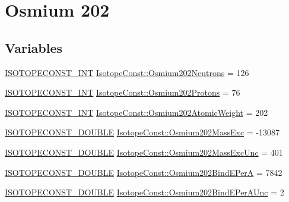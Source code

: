 \hypertarget{group___isotope_const-_osmium-_os202}{}\section{Osmium 202}
\label{group___isotope_const-_osmium-_os202}
\subsection*{Variables}
\begin{DoxyCompactItemize}
\item 
\mbox{\hyperlink{group___isotope_const-_macros_ga5f18360b3e99483a35c32d789e62621c}{I\+S\+O\+T\+O\+P\+E\+C\+O\+N\+S\+T\+\_\+\+I\+NT}} \mbox{\hyperlink{group___isotope_const-_osmium-_os202_ga34734d8dc110f511aa710b1c0f65a546}{Isotope\+Const\+::\+Osmium202\+Neutrons}} = 126
\item 
\mbox{\hyperlink{group___isotope_const-_macros_ga5f18360b3e99483a35c32d789e62621c}{I\+S\+O\+T\+O\+P\+E\+C\+O\+N\+S\+T\+\_\+\+I\+NT}} \mbox{\hyperlink{group___isotope_const-_osmium-_os202_ga82ee0d50f3615f4c6d0e653bf374734b}{Isotope\+Const\+::\+Osmium202\+Protons}} = 76
\item 
\mbox{\hyperlink{group___isotope_const-_macros_ga5f18360b3e99483a35c32d789e62621c}{I\+S\+O\+T\+O\+P\+E\+C\+O\+N\+S\+T\+\_\+\+I\+NT}} \mbox{\hyperlink{group___isotope_const-_osmium-_os202_ga24668aa039cf7981f9346193b29972a8}{Isotope\+Const\+::\+Osmium202\+Atomic\+Weight}} = 202
\item 
\mbox{\hyperlink{group___isotope_const-_macros_ga8f45a7272ce02c0b4c65c44636ed719a}{I\+S\+O\+T\+O\+P\+E\+C\+O\+N\+S\+T\+\_\+\+D\+O\+U\+B\+LE}} \mbox{\hyperlink{group___isotope_const-_osmium-_os202_gac935b28272b77e0fa898fdcc9ae56732}{Isotope\+Const\+::\+Osmium202\+Mass\+Exc}} = -\/13087
\item 
\mbox{\hyperlink{group___isotope_const-_macros_ga8f45a7272ce02c0b4c65c44636ed719a}{I\+S\+O\+T\+O\+P\+E\+C\+O\+N\+S\+T\+\_\+\+D\+O\+U\+B\+LE}} \mbox{\hyperlink{group___isotope_const-_osmium-_os202_ga17db136754686884f47c11d40604431c}{Isotope\+Const\+::\+Osmium202\+Mass\+Exc\+Unc}} = 401
\item 
\mbox{\hyperlink{group___isotope_const-_macros_ga8f45a7272ce02c0b4c65c44636ed719a}{I\+S\+O\+T\+O\+P\+E\+C\+O\+N\+S\+T\+\_\+\+D\+O\+U\+B\+LE}} \mbox{\hyperlink{group___isotope_const-_osmium-_os202_ga34dbbc7510856dd3c8524faaba2b309d}{Isotope\+Const\+::\+Osmium202\+Bind\+E\+PerA}} = 7842
\item 
\mbox{\hyperlink{group___isotope_const-_macros_ga8f45a7272ce02c0b4c65c44636ed719a}{I\+S\+O\+T\+O\+P\+E\+C\+O\+N\+S\+T\+\_\+\+D\+O\+U\+B\+LE}} \mbox{\hyperlink{group___isotope_const-_osmium-_os202_ga4019a84816d6ce63a7b66a3f4e330589}{Isotope\+Const\+::\+Osmium202\+Bind\+E\+Per\+A\+Unc}} = 2

\end{DoxyCompactItemize}
